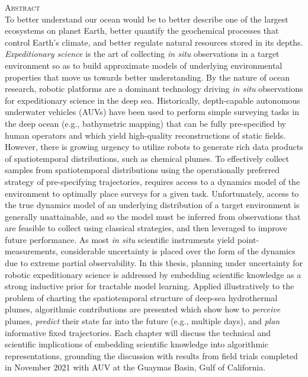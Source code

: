     \begin{singlespace}
    {\parindent0pt 
        {\large \textsc{Abstract}} \\ %

        To better understand our ocean would be to better describe one of the largest ecosystems on planet Earth, better quantify the geochemical processes that control Earth's climate, and better regulate natural resources stored in its depths. \emph{Expeditionary science} is the art of collecting \emph{in situ} observations in a target environment so as to build approximate models of underlying environmental properties that move us towards better understanding. By the nature of ocean research, robotic platforms are a dominant technology driving \emph{in situ} observations for expeditionary science in the deep sea. Historically, depth-capable autonomous underwater vehicles (AUVs) have been used to perform simple surveying tasks in the deep ocean (e.g., bathymetric mapping) that can be fully pre-specified by human operators and which yield high-quality reconstructions of static fields. However, there is growing urgency to utilize robots to generate rich data products of spatiotemporal distributions, such as chemical plumes. To effectively collect samples from spatiotemporal distributions using the operationally preferred strategy of pre-specifying trajectories, requires access to a dynamics model of the environment to optimally place surveys for a given task. Unfortunately, access to the true dynamics model of an underlying distribution of a target environment is generally unattainable, and so the model must be inferred from observations that are feasible to collect using classical strategies, and then leveraged to improve future performance. As most \emph{in situ} scientific instruments yield point-measurements, considerable uncertainty is placed over the form of the dynamics due to extreme partial observability. In this thesis, planning under uncertainty for robotic expeditionary science is addressed by embedding scientific knowledge as a strong inductive prior for tractable model learning. Applied illustratively to the problem of charting the spatiotemporal structure of deep-sea hydrothermal plumes, algorithmic contributions are presented which show how to \emph{perceive} plumes, \emph{predict} their state far into the future (e.g., multiple days), and \emph{plan} informative fixed trajectories. Each chapter will discuss the technical and scientific implications of embedding scientific knowledge into algorithmic representations, grounding the discussion with results from field trials completed in November 2021 with AUV \Sentry at the Guaymas Basin, Gulf of California.\\ 
        
}
\end{singlespace}
